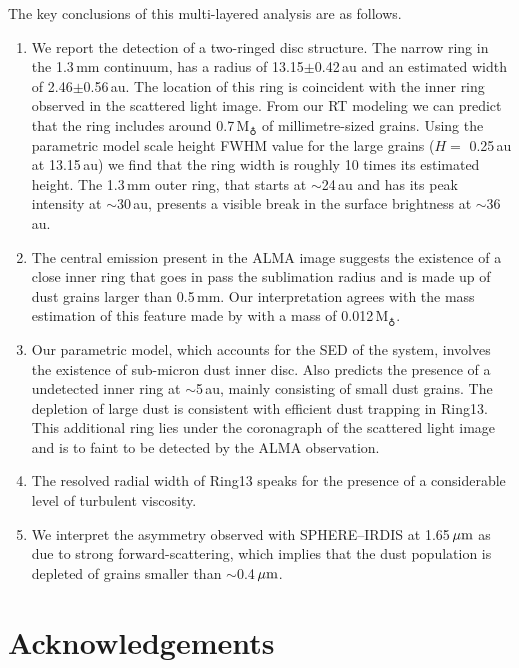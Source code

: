 \documentclass[fleqn,usenatbib,useAMS]{mnras}
\begin{document}
The key conclusions of this multi-layered analysis are as follows.
\begin{enumerate}
  \item We report the detection of a two-ringed disc structure. The narrow ring in the 1.3\,mm continuum, has a radius of 13.15$\pm$0.42\,au and an estimated width of 2.46$\pm$0.56\,au. The location of this ring is coincident with the inner ring observed in the scattered light image. From our RT modeling we can predict that the ring includes around 0.7\,M$_{\earth}$ of millimetre-sized grains. Using the parametric model scale height FWHM value for the large grains ($H=$ 0.25\,au at 13.15\,au) we find that the ring width is roughly 10 times its estimated height. The 1.3\,mm outer ring, that starts at $\sim$24\,au and has its peak intensity at $\sim$30\,au, presents a visible break in the surface brightness at $\sim$36\,au.
  
  \item The central emission present in the ALMA image suggests the existence of a close inner ring that goes in pass the sublimation radius and is made up of dust grains larger than 0.5\,mm. Our interpretation agrees with the mass estimation of this feature made by \citet{Francis_2020} with a mass of 0.012\,M$_{\earth}$. 
  
  \item Our parametric model, which accounts for the SED of the system, involves the existence of sub-micron dust inner disc. Also predicts the presence of a undetected inner ring at $\sim$5\,au, mainly consisting of small dust grains. The depletion of large dust is consistent with efficient dust trapping in Ring13. This additional ring lies under the coronagraph of the scattered light image and is to faint to be detected by the ALMA observation.
  
  \item The resolved radial width of Ring13 speaks for the presence of a considerable level of turbulent viscosity.

  \item We interpret the asymmetry observed with SPHERE--IRDIS at 1.65\,$\hbox{$\mu$m}$ as due to strong forward-scattering, which implies that the dust population is depleted of grains smaller than $\sim$0.4\,$\hbox{$\mu$m}$.
  
\end{enumerate}



\section*{Acknowledgements}
\end{document}
